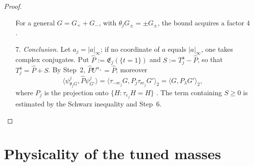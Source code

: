 \documentclass[11pt]{amsart}
\theoremstyle{definition}
\begin{document}
\begin{proof}
\begin{enumerate}
For a general $G=G_++G_-$, with $\theta_jG_\pm=\pm G_\pm$, the bound acquires a factor $4$ \cite[Lemma~12.38]{QEDII}.
\item[7.] \emph{Conclusion.}
Let $a_j=|a|_\infty$; if no coordinate of $a$ equals $|a|_\infty$, one takes complex conjugates.
Put $\hat P:=\mathfrak E_j(\{t=1\})$ and $S:=T_j^{\mathsf a}-\hat P$, so that $T_j^{\mathsf a}=\hat P+S$.
By Step~2, $\hat PU^{a_\perp}=\hat P$; moreover
\begin{equation*}
\bigl\langle\psi^j_{\theta_jG},\hat P\psi^j_{G'}\bigr\rangle=\bigl\langle\tau_{-\mathsf re_j}G,P_j\tau_{\mathsf re_j}G'\bigr\rangle_2=\langle G,P_\lambda G'\rangle_2,
\end{equation*}
where $P_j$ is the projection onto $\{H:\tau_{e_j}H=H\}$ \cite[proof of Theorem~10.12\,(c), Step~1; Theorem~10.12\,(c)]{QEDII}.
The term containing $S\ge0$ is estimated by the Schwarz inequality and Step~6.
\end{enumerate}
\end{proof}


\section{Physicality of the tuned masses}
\end{document}
